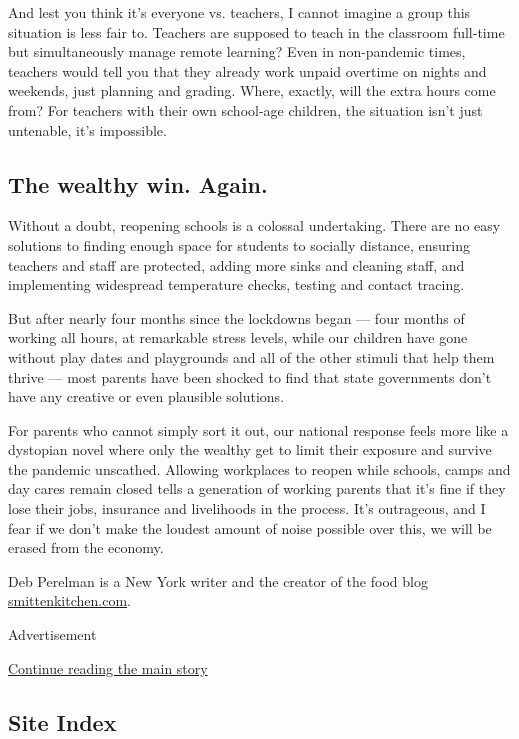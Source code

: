 And lest you think it's everyone vs. teachers, I cannot imagine a group
this situation is less fair to. Teachers are supposed to teach in the
classroom full-time but simultaneously manage remote learning? Even in
non-pandemic times, teachers would tell you that they already work
unpaid overtime on nights and weekends, just planning and grading.
Where, exactly, will the extra hours come from? For teachers with their
own school-age children, the situation isn't just untenable, it's
impossible.

\hypertarget{the-wealthy-win-again}{%
\subsection{The wealthy win. Again.}\label{the-wealthy-win-again}}

Without a doubt, reopening schools is a colossal undertaking. There are
no easy solutions to finding enough space for students to socially
distance, ensuring teachers and staff are protected, adding more sinks
and cleaning staff, and implementing widespread temperature checks,
testing and contact tracing.

But after nearly four months since the lockdowns began --- four months
of working all hours, at remarkable stress levels, while our children
have gone without play dates and playgrounds and all of the other
stimuli that help them thrive --- most parents have been shocked to find
that state governments don't have any creative or even plausible
solutions.

For parents who cannot simply sort it out, our national response feels
more like a dystopian novel where only the wealthy get to limit their
exposure and survive the pandemic unscathed. Allowing workplaces to
reopen while schools, camps and day cares remain closed tells a
generation of working parents that it's fine if they lose their jobs,
insurance and livelihoods in the process. It's outrageous, and I fear if
we don't make the loudest amount of noise possible over this, we will be
erased from the economy.

Deb Perelman is a New York writer and the creator of the food blog
\href{http://smittenkitchen.com/}{smittenkitchen.com}.

Advertisement

\protect\hyperlink{after-bottom}{Continue reading the main story}

\hypertarget{site-index}{%
\subsection{Site Index}\label{site-index}}


